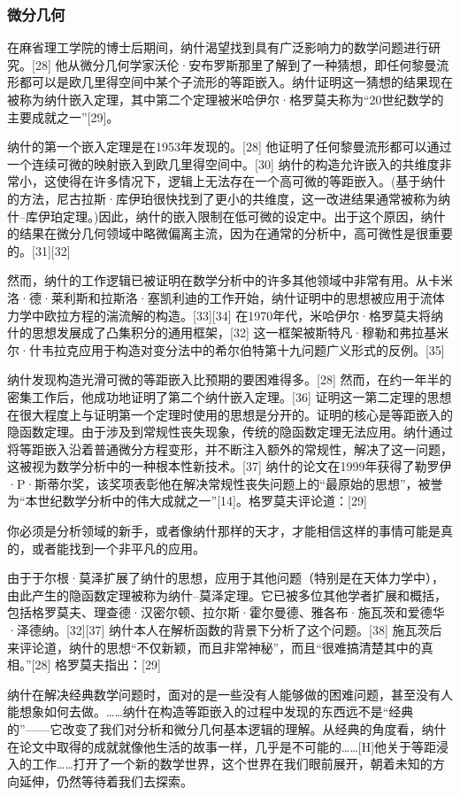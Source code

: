 \subsubsection{微分几何} 
在麻省理工学院的博士后期间，纳什渴望找到具有广泛影响力的数学问题进行研究。[28] 他从微分几何学家沃伦·安布罗斯那里了解到了一种猜想，即任何黎曼流形都可以是欧几里得空间中某个子流形的等距嵌入。纳什证明这一猜想的结果现在被称为纳什嵌入定理，其中第二个定理被米哈伊尔·格罗莫夫称为“20世纪数学的主要成就之一”[29]。

纳什的第一个嵌入定理是在1953年发现的。[28] 他证明了任何黎曼流形都可以通过一个连续可微的映射嵌入到欧几里得空间中。[30] 纳什的构造允许嵌入的共维度非常小，这使得在许多情况下，逻辑上无法存在一个高可微的等距嵌入。(基于纳什的方法，尼古拉斯·库伊珀很快找到了更小的共维度，这一改进结果通常被称为纳什–库伊珀定理。)因此，纳什的嵌入限制在低可微的设定中。出于这个原因，纳什的结果在微分几何领域中略微偏离主流，因为在通常的分析中，高可微性是很重要的。[31][32]

然而，纳什的工作逻辑已被证明在数学分析中的许多其他领域中非常有用。从卡米洛·德·莱利斯和拉斯洛·塞凯利迪的工作开始，纳什证明中的思想被应用于流体力学中欧拉方程的湍流解的构造。[33][34] 在1970年代，米哈伊尔·格罗莫夫将纳什的思想发展成了凸集积分的通用框架，[32] 这一框架被斯特凡·穆勒和弗拉基米尔·什韦拉克应用于构造对变分法中的希尔伯特第十九问题广义形式的反例。[35]

纳什发现构造光滑可微的等距嵌入比预期的要困难得多。[28] 然而，在约一年半的密集工作后，他成功地证明了第二个纳什嵌入定理。[36] 证明这一第二定理的思想在很大程度上与证明第一个定理时使用的思想是分开的。证明的核心是等距嵌入的隐函数定理。由于涉及到常规性丧失现象，传统的隐函数定理无法应用。纳什通过将等距嵌入沿着普通微分方程变形，并不断注入额外的常规性，解决了这一问题，这被视为数学分析中的一种根本性新技术。[37] 纳什的论文在1999年获得了勒罗伊·P·斯蒂尔奖，该奖项表彰他在解决常规性丧失问题上的“最原始的思想”，被誉为“本世纪数学分析中的伟大成就之一”[14]。格罗莫夫评论道：[29]

你必须是分析领域的新手，或者像纳什那样的天才，才能相信这样的事情可能是真的，或者能找到一个非平凡的应用。

由于于尔根·莫泽扩展了纳什的思想，应用于其他问题（特别是在天体力学中），由此产生的隐函数定理被称为纳什–莫泽定理。它已被多位其他学者扩展和概括，包括格罗莫夫、理查德·汉密尔顿、拉尔斯·霍尔曼德、雅各布·施瓦茨和爱德华·泽德纳。[32][37] 纳什本人在解析函数的背景下分析了这个问题。[38] 施瓦茨后来评论道，纳什的思想“不仅新颖，而且非常神秘”，而且“很难搞清楚其中的真相。”[28] 格罗莫夫指出：[29]

纳什在解决经典数学问题时，面对的是一些没有人能够做的困难问题，甚至没有人能想象如何去做。……纳什在构造等距嵌入的过程中发现的东西远不是“经典的”——它改变了我们对分析和微分几何基本逻辑的理解。从经典的角度看，纳什在论文中取得的成就就像他生活的故事一样，几乎是不可能的……[H]他关于等距浸入的工作……打开了一个新的数学世界，这个世界在我们眼前展开，朝着未知的方向延伸，仍然等待着我们去探索。
